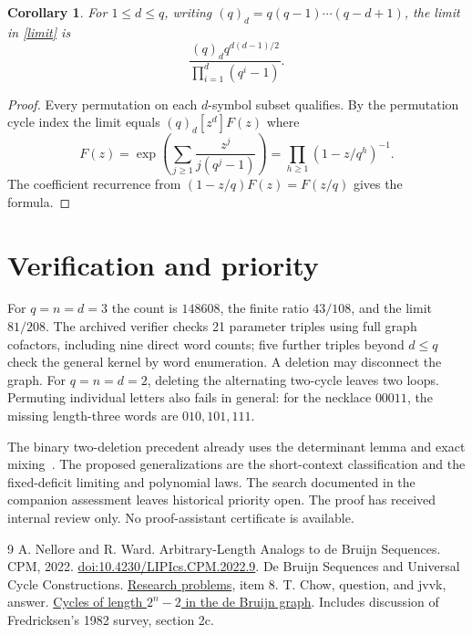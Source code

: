 \documentclass[11pt]{article}
\newtheorem{corollary}[theorem]{Corollary}
\begin{document}
\begin{corollary}
For \(1\le d\le q\), writing \((q)_d=q(q-1)\cdots(q-d+1)\), the limit in \eqref{limit} is
\[
 \frac{(q)_d q^{d(d-1)/2}}{\prod_{i=1}^d(q^i-1)}.
\]
\end{corollary}
\begin{proof}
Every permutation on each \(d\)-symbol subset qualifies. By the permutation cycle index the limit equals \((q)_d[z^d]F(z)\) where
\[
 F(z)=\exp\left(\sum_{j\ge1}\frac{z^j}{j(q^j-1)}\right)
     =\prod_{h\ge1}(1-z/q^h)^{-1}.
\]
The coefficient recurrence from \((1-z/q)F(z)=F(z/q)\) gives the formula.
\end{proof}
\section{Verification and priority}
For \(q=n=d=3\) the count is \(148608\), the finite ratio \(43/108\), and the limit \(81/208\). The archived verifier checks 21 parameter triples using full graph cofactors, including nine direct word counts; five further triples beyond \(d\le q\) check the general kernel by word enumeration. A deletion may disconnect the graph. For \(q=n=d=2\), deleting the alternating two-cycle leaves two loops. Permuting individual letters also fails in general: for the necklace \(00011\), the missing length-three words are \(010,101,111\).

The binary two-deletion precedent already uses the determinant lemma and exact mixing~\cite{chow}. The proposed generalizations are the short-context classification and the fixed-deficit limiting and polynomial laws. The search documented in the companion assessment leaves historical priority open. The proof has received internal review only. No proof-assistant certificate is available.
\begin{thebibliography}{9}
 A. Nellore and R. Ward. Arbitrary-Length Analogs to de Bruijn Sequences. CPM, 2022. \href{https://doi.org/10.4230/LIPIcs.CPM.2022.9}{doi:10.4230/LIPIcs.CPM.2022.9}.
 De Bruijn Sequences and Universal Cycle Constructions. \href{https://debruijnsequence.org/db/db/db/problems}{Research problems}, item 8.
 T. Chow, question, and jvvk, answer. \href{https://mathoverflow.net/questions/227666/}{Cycles of length \(2^n-2\) in the de Bruijn graph}. Includes discussion of Fredricksen's 1982 survey, section 2c.
\end{thebibliography}
\end{document}
